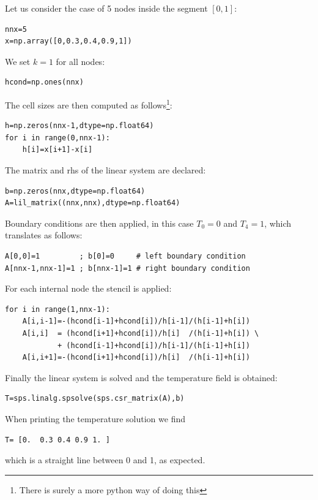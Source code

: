 Let us consider the case of 5 nodes inside the segment $[0,1]$:
\begin{lstlisting}
nnx=5                         
x=np.array([0,0.3,0.4,0.9,1]) 
\end{lstlisting}
We set $k=1$ for all nodes:
\begin{lstlisting}
hcond=np.ones(nnx)  
\end{lstlisting}
The cell sizes are then computed as follows\footnote{There is surely a more python
way of doing this}:
\begin{lstlisting}
h=np.zeros(nnx-1,dtype=np.float64)
for i in range(0,nnx-1):
    h[i]=x[i+1]-x[i]
\end{lstlisting}
The matrix and rhs of the linear system are declared:
\begin{lstlisting}
b=np.zeros(nnx,dtype=np.float64)
A=lil_matrix((nnx,nnx),dtype=np.float64)
\end{lstlisting}
Boundary conditions are then applied, in this case $T_0=0$ and $T_4=1$, 
which translates as follows:
\begin{lstlisting}
A[0,0]=1         ; b[0]=0     # left boundary condition
A[nnx-1,nnx-1]=1 ; b[nnx-1]=1 # right boundary condition
\end{lstlisting}
For each internal node the stencil is applied:
\begin{lstlisting}
for i in range(1,nnx-1):
    A[i,i-1]=-(hcond[i-1]+hcond[i])/h[i-1]/(h[i-1]+h[i])
    A[i,i]  = (hcond[i+1]+hcond[i])/h[i]  /(h[i-1]+h[i]) \
            + (hcond[i-1]+hcond[i])/h[i-1]/(h[i-1]+h[i]) 
    A[i,i+1]=-(hcond[i+1]+hcond[i])/h[i]  /(h[i-1]+h[i]) 
\end{lstlisting}
Finally the linear system is solved and the temperature 
field is obtained:
\begin{lstlisting}
T=sps.linalg.spsolve(sps.csr_matrix(A),b)
\end{lstlisting}
When printing the temperature solution we find 
\begin{lstlisting}
T= [0.  0.3 0.4 0.9 1. ] 
\end{lstlisting}
which is a straight line between 0 and 1, as expected.





